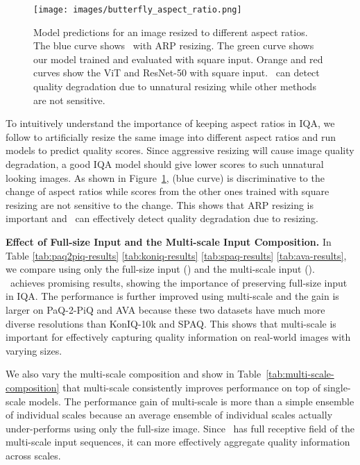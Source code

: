 \begin{figure}[!tp]
\centering
\texttt{[image: images/butterfly\_aspect\_ratio.png]}
\caption{Model predictions for an image resized to different aspect ratios. The blue curve shows \ours\ with ARP resizing. The green curve shows our model trained and evaluated with square input. Orange and red curves show the ViT and ResNet-50 with square input. \ours\ can detect quality degradation due to unnatural resizing while other methods are not sensitive.  }\vspace{-1mm}
\label{fig:butterfly_aspect_ratio} 
\end{figure} 

To intuitively understand the importance of keeping aspect ratios in IQA, we follow \cite{chen2020adaptive} to artificially resize the same image into different aspect ratios and run models to predict quality scores. Since aggressive resizing will cause image quality degradation, a good IQA model should give lower scores to such unnatural looking images. As shown in Figure~\ref{fig:butterfly_aspect_ratio}, {\ours} (blue curve) is discriminative to the change of aspect ratios while scores from the other ones trained with square resizing are not sensitive to the change. This shows that ARP resizing is important and \ours\ can effectively detect quality degradation due to resizing.


\vspace{+1.5mm}
\noindent\textbf{Effect of Full-size Input and the Multi-scale Input Composition.}
In Table \ref{tab:paq2piq-results} \ref{tab:koniq-results} \ref{tab:spaq-results} \ref{tab:ava-results}, we compare using only the full-size input (\fullours) and the multi-scale input (\ours). \fullours\ achieves promising results, showing the importance of preserving full-size input in IQA. The performance is further improved using multi-scale and the gain is larger on PaQ-2-PiQ and AVA because these two datasets have much more diverse resolutions than KonIQ-10k and SPAQ. This shows that multi-scale is important for effectively capturing quality information on real-world images with varying sizes.

We also vary the multi-scale composition and show in Table~\ref{tab:multi-scale-composition} that multi-scale consistently improves performance on top of single-scale models. The performance gain of multi-scale is more than a simple ensemble of individual scales because an average ensemble of individual scales actually under-performs using only the full-size image. Since \ours\ has full receptive field of the multi-scale input sequences, it can more effectively aggregate quality information across scales. 

